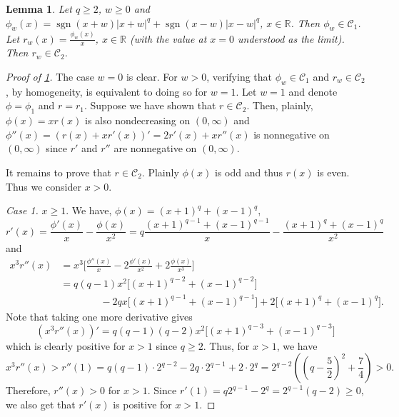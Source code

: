 \documentclass[10pt]{article}
\newcommand{\1}{\textbf{1}}
\newcommand{\R}{\mathbb{R}}
\DeclareMathOperator{\sgn}{sgn}
\newtheorem{lemma}[theorem]{Lemma}
\theoremstyle{remark}
\theoremstyle{definition}
\begin{document}
\begin{lemma}\label{lm:r-is-convex}
Let $q \geq 2$, $w \geq 0$ and $\phi_w(x) = \sgn(x+w)|x+w|^q + \sgn(x-w)|x-w|^q$, $x \in \R$. Then $\phi_w \in \mathcal{C}_1$. Let $r_w(x) = \frac{\phi_w(x)}{x}$, $x \in \R$ (with the value at $x=0$ understood as the limit). Then $r_w \in \mathcal{C}_2$.
\end{lemma}
\begin{proof}[Proof of \ref{lm:r-is-convex}]
The case $w=0$ is clear. For $w > 0$, verifying that $\phi_w \in \mathcal{C}_1$ and $r_w \in \mathcal{C}_2$, by homogeneity, is equivalent to doing so for $w=1$. Let $w=1$ and denote $\phi=\phi_1$ and $r=r_1$. Suppose we have shown that $r \in \mathcal{C}_2$. Then, plainly, $\phi(x) = xr(x)$ is also nondecreasing on $(0,\infty)$ and $\phi''(x) = (r(x) +xr'(x))' = 2r'(x) + xr''(x)$ is nonnegative on $(0,\infty)$ since $r'$ and $r''$ are nonnegative on $(0,\infty)$. 

It remains to prove that $r \in \mathcal{C}_2$. Plainly $\phi(x)$ is odd and thus $r(x)$ is even. Thus we consider $x > 0$.

\bigskip
\noindent
\emph{Case 1.} $x \geq 1$. We have, $\phi(x) = (x+1)^q + (x-1)^q$,
\[
r'(x) = \frac{\phi'(x)}{x} - \frac{\phi(x)}{x^2} = q\frac{(x+1)^{q-1}+(x-1)^{q-1}}{x} - \frac{(x+1)^q+(x-1)^q}{x^2}
\]
and
\begin{align*}
x^3r''(x) &= x^3\Bigg[\frac{\phi''(x)}{x}-2\frac{\phi'(x)}{x^2}+2\frac{\phi(x)}{x^3}\Bigg]\\
&=q(q-1)x^2\Big[(x+1)^{q-2}+(x-1)^{q-2}\Big] \\
&\qquad\qquad-2qx\Big[(x+1)^{q-1}+(x-1)^{q-1}\Big]+ 2\Big[(x+1)^q+(x-1)^q\Big].
\end{align*}
Note that taking one more derivative gives
\[
(x^3r''(x))' = q(q-1)(q-2)x^2\Big[(x+1)^{q-3}+(x-1)^{q-3}\Big]
\]
which is clearly positive for $x > 1$ since $q \geq 2$. Thus, for $x > 1$, we have
\[
x^3r''(x) > r''(1) = q(q-1)\cdot 2^{q-2}-2q\cdot 2^{q-1}+2\cdot 2^{q} = 2^{q-2}\left( \left(q-\frac{5}{2}\right)^2 + \frac{7}{4}\right) > 0.
\]
Therefore, $r''(x) > 0$ for $x > 1$. Since $r'(1) = q2^{q-1}-2^q = 2^{q-1}(q-2) \geq 0$, we also get that $r'(x)$ is positive for $x > 1$.




\end{proof}
\end{document}
